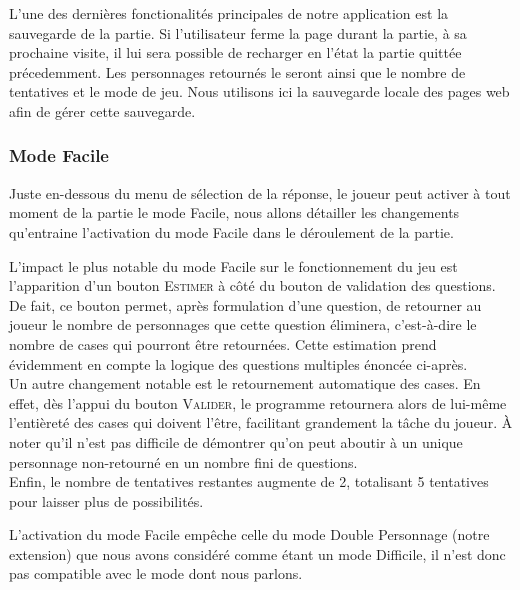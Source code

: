 \documentclass{article}
\begin{document}
        		\par
        		\pagebreak
        		L'une des dernières fonctionalités principales de notre application est la sauvegarde de la partie. Si l'utilisateur ferme la page durant la partie, à sa prochaine visite, il lui sera possible de recharger en l'état la partie quittée précedemment. Les personnages retournés le seront ainsi que le nombre de tentatives et le mode de jeu. Nous utilisons ici la sauvegarde locale des pages web afin de gérer cette sauvegarde.
        		
		    \subsubsection{Mode Facile}
		        Juste en-dessous du menu de sélection de la réponse, le joueur peut activer à tout moment de la partie le mode \textsf{Facile}, nous allons détailler les changements qu'entraine l'activation du mode \textsf{Facile} dans le déroulement de la partie.\\
		    \par
		        L'impact le plus notable du mode \textsf{Facile} sur le fonctionnement du jeu est l'apparition d'un bouton \textsc{Estimer} à côté du bouton de validation des questions. De fait, ce bouton permet, après formulation d'une question, de retourner au joueur le nombre de personnages que cette question éliminera, c'est-à-dire le nombre de cases qui pourront être retournées. Cette estimation prend évidemment en compte la logique des questions multiples énoncée ci-après.\\
	        	Un autre changement notable est le retournement automatique des cases. En effet, dès l'appui du bouton \textsc{Valider}, le programme retournera alors de lui-même l'entièreté des cases qui doivent l'être, facilitant grandement la tâche du joueur. À noter qu'il n'est pas difficile de démontrer qu'on peut aboutir à un unique personnage non-retourné en un nombre fini de questions.\\
		        Enfin, le nombre de tentatives restantes augmente de 2, totalisant 5 tentatives pour laisser plus de possibilités.\\
		        \par
		        L'activation du mode \textsf{Facile} empêche celle du mode \textsf{Double Personnage} (notre extension) que nous avons considéré comme étant un mode \textsf{Difficile}, il n'est donc pas compatible avec le mode dont nous parlons.
		
\end{document}
